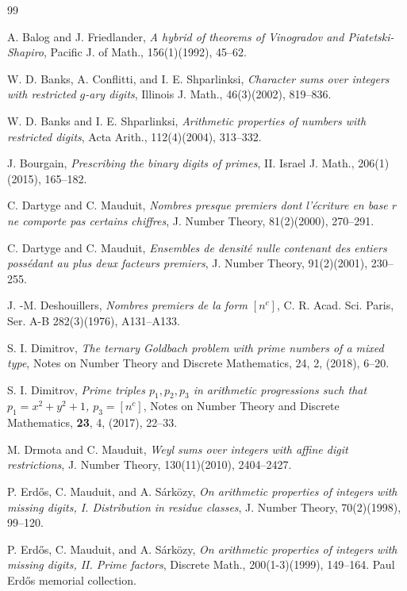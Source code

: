 \documentclass{amsart}
\numberwithin{equation}{subsection}
\begin{document}
%
%
%
%
\vspace{10mm}
\begin{thebibliography}{99}%

 A. Balog and J. Friedlander, \textit{A hybrid of theorems of Vinogradov and Piatetski-Shapiro}, Pacific J. of Math., 156(1)(1992), 45--62.

 W. D. Banks, A. Conflitti, and I. E. Shparlinksi, \textit{Character sums over integers with restricted $g$-ary digits}, Illinois J. Math., 46(3)(2002), 819--836.

 W. D. Banks and I. E. Shparlinksi, \textit{Arithmetic properties of numbers with restricted digits}, Acta Arith., 112(4)(2004), 313--332.

 J. Bourgain, \textit{Prescribing the binary digits of primes}, II. Israel J. Math., 206(1)(2015), 165--182.

 C. Dartyge and C. Mauduit, \textit{Nombres presque premiers dont l'\'{e}criture en base $r$ ne comporte pas certains chiffres}, J. Number Theory, 81(2)(2000), 270--291.

 C. Dartyge and C. Mauduit, \textit{Ensembles de densit\'{e} nulle contenant des entiers poss\'edant au plus deux facteurs premiers}, J. Number Theory, 91(2)(2001), 230--255.

 J. -M. Deshouillers, \textit{Nombres premiers de la form $[n^c]$}, C. R. Acad. Sci. Paris, Ser. A-B 282(3)(1976), A131--A133.

 S. I. Dimitrov, \textit{The ternary Goldbach problem with prime numbers of a
mixed type}, Notes on Number Theory and Discrete Mathematics, 24, 2,
(2018), 6--20.

 S. I. Dimitrov, \textit{Prime triples $p_1,p_2,p_3$ in arithmetic progressions
such that $p_1=x^2+y^2+1$,\; $p_3=[n^c]$}, Notes on Number Theory and
Discrete Mathematics,
\textbf{23}, 4, (2017), 22--33.

 M. Drmota and C. Mauduit, \textit{Weyl sums over integers with affine digit restrictions}, J. Number Theory, 130(11)(2010), 2404--2427.

 P. Erd\H{o}s, C. Mauduit, and A. S\'{a}rk\"{o}zy, \textit{On arithmetic properties of integers with missing digits, I. Distribution in residue classes}, J. Number Theory, 70(2)(1998), 99--120. 

 P. Erd\H{o}s, C. Mauduit, and A. S\'{a}rk\"{o}zy, \textit{On arithmetic properties of integers with missing digits, II. Prime factors}, Discrete Math., 200(1-3)(1999), 149--164. Paul Erd\H{o}s memorial collection.




\end{thebibliography}
\end{document}
